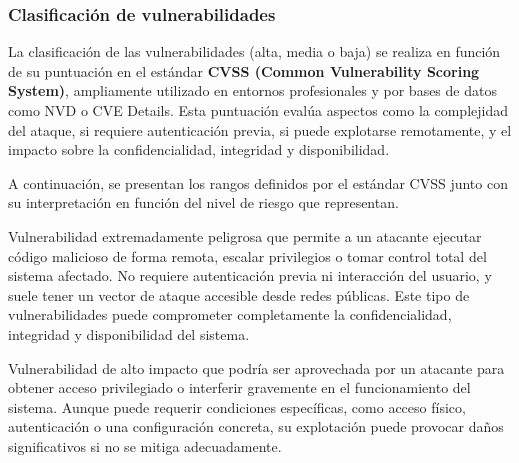\documentclass[a4paper, 11pt]{article}
\begin{document}
\vspace{0.5cm}

\subsubsection{Clasificación de vulnerabilidades}

La clasificación de las vulnerabilidades (alta, media o baja) se realiza en función de su puntuación en el estándar \textbf{CVSS (Common Vulnerability Scoring System)}, ampliamente utilizado en entornos profesionales y por bases de datos como NVD o CVE Details. Esta puntuación evalúa aspectos como la complejidad del ataque, si requiere autenticación previa, si puede explotarse remotamente, y el impacto sobre la confidencialidad, integridad y disponibilidad. \cite{cvss}
\vspace{0.5cm}

A continuación, se presentan los rangos definidos por el estándar CVSS junto con su interpretación en función del nivel de riesgo que representan.

\vspace{0.5cm}

\begin{tcolorbox}[colback=cvsscritical!10, colframe=cvsscritical!80!black, coltitle=white,
    title=Crítica (CVSS 9.0 -- 10.0)]
Vulnerabilidad extremadamente peligrosa que permite a un atacante ejecutar código malicioso de forma remota, escalar privilegios o tomar control total del sistema afectado. No requiere autenticación previa ni interacción del usuario, y suele tener un vector de ataque accesible desde redes públicas. Este tipo de vulnerabilidades puede comprometer completamente la confidencialidad, integridad y disponibilidad del sistema.
\end{tcolorbox}

\vspace{0.2cm}

\begin{tcolorbox}[colback=cvsshigh!10, colframe=cvsshigh!80!black, coltitle=white,
    title=Alta (CVSS 7.0 -- 8.9)]
Vulnerabilidad de alto impacto que podría ser aprovechada por un atacante para obtener acceso privilegiado o interferir gravemente en el funcionamiento del sistema. Aunque puede requerir condiciones específicas, como acceso físico, autenticación o una configuración concreta, su explotación puede provocar daños significativos si no se mitiga adecuadamente.
\end{tcolorbox}

\vspace{0.2cm}
\end{document}
